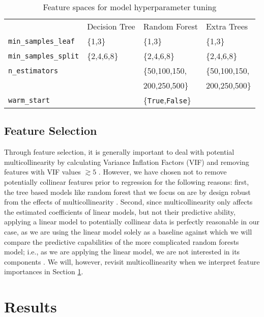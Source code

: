 \documentclass[fleqn,usenatbib,twocolumn]{mnras}%
\begin{document}
\begin{table}\label{tab:hyper-tuning}
    \caption{Feature spaces for model hyperparameter tuning}
    \label{tab:pairwise}
    \centering

    \begin{tabular}{llll}
\toprule
 & Decision Tree & Random Forest & Extra Trees \\
\texttt{min\_samples\_leaf} & \{1,3\} & \{1,3\} & \{1,3\} \\ 
\texttt{min\_samples\_split} & \{2,4,6,8\} & \{2,4,6,8\} & \{2,4,6,8\} \\ 
\texttt{n\_estimators} & & \{50,100,150, & \{50,100,150, \\ 
& & 200,250,500\} & 200,250,500\} \\ 
\texttt{warm\_start} & & \{\texttt{True},\texttt{False}\} & \\
\midrule
\bottomrule
\end{tabular}
\end{table}

\subsection{Feature Selection}\label{sec:feature_selection}

Through feature selection, it is generally important to deal with potential multicollinearity by calculating Variance Inflation Factors (VIF) and removing features with VIF values $\gtrsim5$ \citep{kline1998principles, Sheather2008-mc}. However, we have chosen not to remove potentially collinear features prior to regression for the following reasons: first, the tree based models like random forest that we focus on are by design robust from the effects of multicollinearity \citep{Strobl2008,2021arXiv211102513C}. Second, since multicollinearity only affects the estimated coefficients of linear models, but not their predictive ability, applying a linear model to potentially collinear data is perfectly reasonable in our case, as we are using the linear model solely as a baseline against which we will compare the predictive capabilities of the more complicated random forests model; i.e., as we are applying the linear model, we are not interested in its components \citep{multicollinearityclass,multicollinearityregression}. We will, however, revisit multicollinearity when we interpret feature importances in Section \ref{sec:results}.

\section{Results} \label{sec:results}
\end{document}
